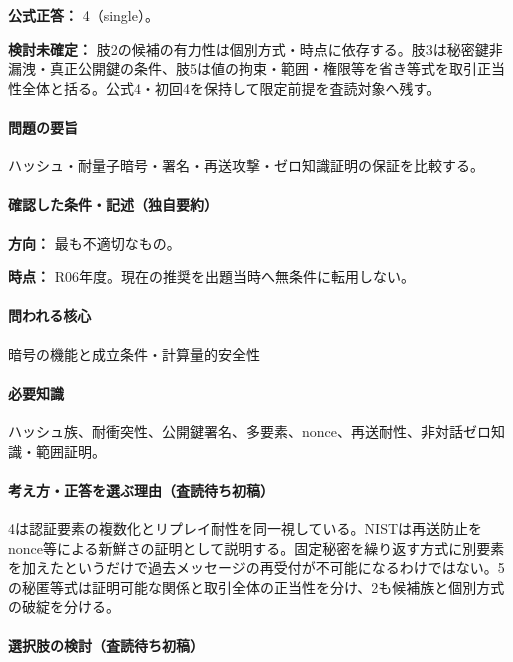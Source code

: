 \textbf{公式正答：} 4（single）。

\par\textbf{検討未確定：} 肢2の候補の有力性は個別方式・時点に依存する。肢3は秘密鍵非漏洩・真正公開鍵の条件、肢5は値の拘束・範囲・権限等を省き等式を取引正当性全体と括る。公式4・初回4を保持して限定前提を査読対象へ残す。

\paragraph{問題の要旨} ハッシュ・耐量子暗号・署名・再送攻撃・ゼロ知識証明の保証を比較する。

\paragraph{確認した条件・記述（独自要約）}\mbox{}\par

\noindent\textbf{方向：} 最も不適切なもの。\par

\noindent\textbf{時点：} R06年度。現在の推奨を出題当時へ無条件に転用しない。\par

\paragraph{問われる核心} 暗号の機能と成立条件・計算量的安全性

\paragraph{必要知識} ハッシュ族、耐衝突性、公開鍵署名、多要素、nonce、再送耐性、非対話ゼロ知識・範囲証明。

\paragraph{考え方・正答を選ぶ理由（査読待ち初稿）} 4は認証要素の複数化とリプレイ耐性を同一視している。NISTは再送防止をnonce等による新鮮さの証明として説明する。固定秘密を繰り返す方式に別要素を加えたというだけで過去メッセージの再受付が不可能になるわけではない。5の秘匿等式は証明可能な関係と取引全体の正当性を分け、2も候補族と個別方式の破綻を分ける。

\paragraph{選択肢の検討（査読待ち初稿）}\mbox{}\par

